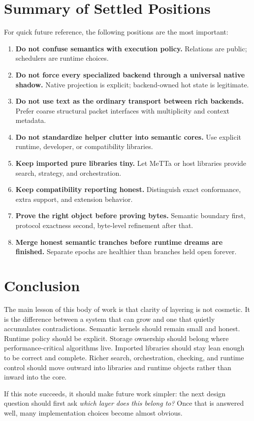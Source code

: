 \documentclass[11pt]{article}
\newcommand{\strong}[1]{\textbf{#1}}
\begin{document}
\section{Summary of Settled Positions}

For quick future reference, the following positions are the most important:

\begin{enumerate}
  \item \strong{Do not confuse semantics with execution policy.}
  Relations are public; schedulers are runtime choices.

  \item \strong{Do not force every specialized backend through a universal native shadow.}
  Native projection is explicit; backend-owned hot state is legitimate.

  \item \strong{Do not use text as the ordinary transport between rich backends.}
  Prefer coarse structural packet interfaces with multiplicity and context metadata.

  \item \strong{Do not standardize helper clutter into semantic cores.}
  Use explicit runtime, developer, or compatibility libraries.

  \item \strong{Keep imported pure libraries tiny.}
  Let MeTTa or host libraries provide search, strategy, and orchestration.

  \item \strong{Keep compatibility reporting honest.}
  Distinguish exact conformance, extra support, and extension behavior.

  \item \strong{Prove the right object before proving bytes.}
  Semantic boundary first, protocol exactness second, byte-level refinement after that.

  \item \strong{Merge honest semantic tranches before runtime dreams are finished.}
  Separate epochs are healthier than branches held open forever.
\end{enumerate}

\section{Conclusion}

The main lesson of this body of work is that clarity of layering is not cosmetic. It is the difference between a system that can grow and one that quietly accumulates contradictions. Semantic kernels should remain small and honest. Runtime policy should be explicit. Storage ownership should belong where performance-critical algorithms live. Imported libraries should stay lean enough to be correct and complete. Richer search, orchestration, checking, and runtime control should move outward into libraries and runtime objects rather than inward into the core.

If this note succeeds, it should make future work simpler: the next design question should first ask \emph{which layer does this belong to?} Once that is answered well, many implementation choices become almost obvious.
\end{document}
